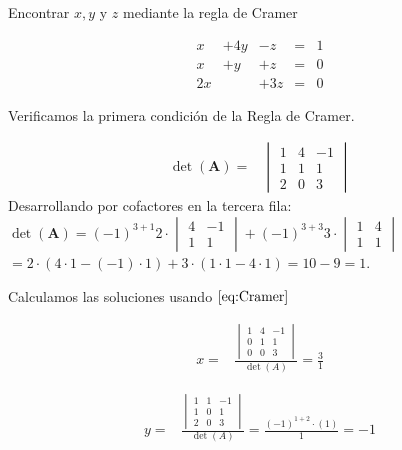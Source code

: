 \documentclass[
]{article}
\begin{document}
Encontrar \(x,y\) y \(z\) mediante la regla de Cramer

\begin{equation}
\begin{array}{cccccc}
     x & +4y   &-z  & = & 1       \\ 
     x & +y    &+z  & = & 0       \\
     2x&       &+3z & = & 0
\end{array}
\end{equation}

Verificamos la primera condición de la Regla de Cramer.

\begin{equation*}
\begin{array}{ccc}
\det(\mathbf{A})     = &  \begin{vmatrix} 
                        1     & 4        & -1      \\ 
                        1     & 1        &  1       \\
                        2     & 0        & 3
  \end{vmatrix} 
\end{array}
\end{equation*} Desarrollando por cofactores en la tercera fila:
\(\det(\mathbf{A})=(-1)^{3+1}2\cdot \begin{vmatrix} 4 & -1 \\ 1 & 1 \end{vmatrix} + (-1)^{3+3}3\cdot \begin{vmatrix} 1 & 4 \\ 1 & 1 \end{vmatrix}\)
\(=2\cdot(4\cdot 1 - (-1)\cdot 1) + 3\cdot (1\cdot 1 - 4\cdot 1)=10 - 9=1\).

Calculamos las soluciones usando \(\eqref{eq:Cramer}\)

\begin{equation*}
    \begin{array}{cc}
      x=& \frac{\begin{vmatrix} 1 & 4 & -1 \\ 0 & 1 & 1 \\ 0 & 0 & 3  \end{vmatrix}}{\det(A)} = \frac{3}{1} 
    \end{array}
  \end{equation*}

\begin{equation*}  
    \begin{array}{cc}
      y=& \frac{\begin{vmatrix} 1 & 1 & -1 \\ 1 & 0 & 1 \\ 2 & 0 & 3  \end{vmatrix}}{\det(A)} = \frac{(-1)^{1+2}\cdot (1)}{1}=-1 
    \end{array}
  \end{equation*}
\end{document}
